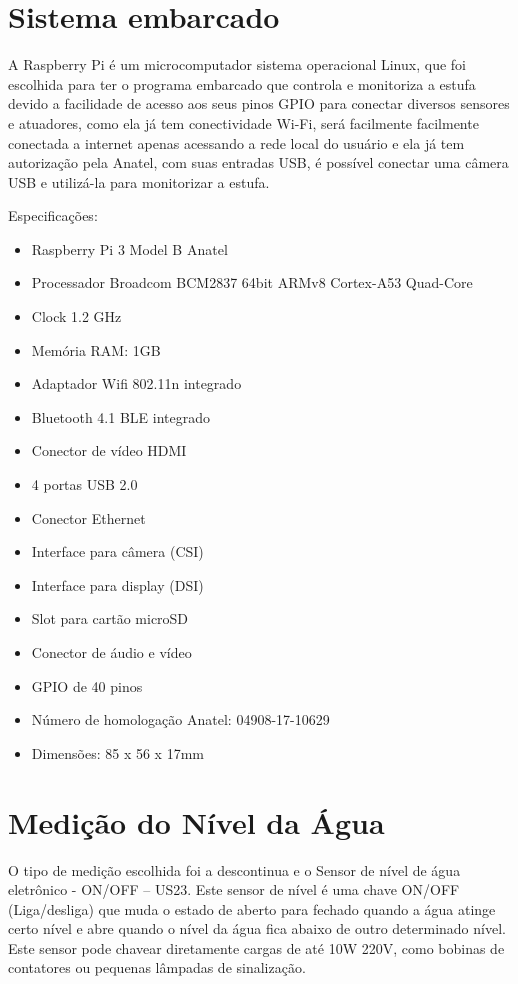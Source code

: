 \section{Sistema embarcado}
A Raspberry Pi é um microcomputador sistema operacional Linux, que foi escolhida para ter o programa embarcado que controla e monitoriza a estufa devido a facilidade de acesso aos seus pinos GPIO para conectar diversos sensores e atuadores, como ela já tem conectividade Wi-Fi, será facilmente facilmente conectada a internet apenas acessando a rede local do usuário e ela já tem autorização pela Anatel, com suas entradas USB, é possível conectar uma câmera USB e utilizá-la para monitorizar a estufa\cite{raspberry2018}.

Especificações:

\begin{itemize}
	\item Raspberry Pi 3 Model B Anatel
	\item Processador Broadcom BCM2837 64bit ARMv8 Cortex-A53 Quad-Core
	\item Clock 1.2 GHz
	\item Memória RAM: 1GB
	\item Adaptador Wifi 802.11n integrado
	\item Bluetooth 4.1 BLE integrado
	\item Conector de vídeo HDMI
	\item 4 portas USB 2.0
	\item Conector Ethernet
	\item Interface para câmera (CSI)
	\item Interface para display (DSI)
	\item Slot para cartão microSD
	\item Conector de áudio e vídeo
	\item GPIO de 40 pinos
	\item Número de homologação Anatel: 04908-17-10629 
	\item Dimensões: 85 x 56 x 17mm
\end{itemize}

\section{Medição do Nível da Água}

O tipo de medição escolhida foi a descontinua e o Sensor de nível de água eletrônico - ON/OFF – US23. Este sensor de nível é uma chave ON/OFF (Liga/desliga) que muda o estado de aberto para fechado quando a água atinge certo nível e abre quando o nível da água fica abaixo de outro determinado nível. Este sensor pode chavear diretamente cargas de até 10W 220V, como bobinas de contatores ou pequenas lâmpadas de sinalização.

